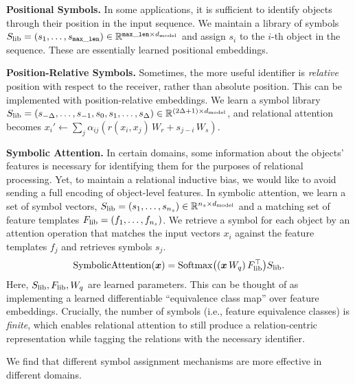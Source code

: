 \textbf{Positional Symbols.} In some applications, it is sufficient to identify objects through their position in the input sequence. We maintain a library of symbols $S_\mathrm{lib} = (s_1, \ldots, s_{\mathtt{max\_len}}) \in \mathbb{R}^{\mathtt{max\_len} \times d_{\mathrm{model}}}$ and assign $s_i$ to the $i$-th object in the sequence. These are essentially learned positional embeddings.

\textbf{Position-Relative Symbols.} Sometimes, the more useful identifier is \textit{relative} position with respect to the receiver, rather than absolute position. This can be implemented with position-relative embeddings. We learn a symbol library $S_\mathrm{lib} = (s_{-\Delta}, \ldots, s_{-1}, s_0, s_1, \ldots, s_{\Delta}) \in \mathbb{R}^{(2 \Delta + 1) \times d_{\mathrm{model}}}$, and relational attention becomes $x_i' \gets \sum_{j} \alpha_{ij}  (r(x_i, x_j) \, W_r + s_{j-i} \,  W_s)$.%

\textbf{Symbolic Attention.} In certain domains, some information about the objects' features is necessary for identifying them for the purposes of relational processing. Yet, to maintain a relational inductive bias, we would like to avoid sending a full encoding of object-level features. In symbolic attention, we learn a set of symbol vectors, $S_\mathrm{lib} = (s_1, \ldots, s_{n_s}) \in \mathbb{R}^{n_s \times d_{\mathrm{model}}}$ and a matching set of feature templates $F_\mathrm{lib} = (f_1, \ldots, f_{n_s})$. We retrieve a symbol for each object by an attention operation that matches the input vectors $x_i$ against the feature templates $f_j$ and retrieves symbols $s_j$.
\begin{equation}
  \mathrm{SymbolicAttention}(\bm{x}) = \mathrm{Softmax}\big((\bm{x} \, W_q)\, F_\mathrm{lib}^\top\big) S_\mathrm{lib}.
\end{equation}
Here, $S_\mathrm{lib}, F_\mathrm{lib}, W_q$ are learned parameters. This can be thought of as implementing a learned differentiable ``equivalence class map'' over feature embeddings. Crucially, the number of symbols (i.e., feature equivalence classes) is \textit{finite}, which enables relational attention to still produce a relation-centric representation while tagging the relations with the necessary identifier.

We find that different symbol assignment mechanisms are more effective in different domains.


